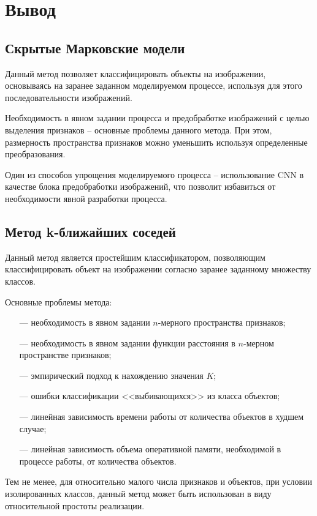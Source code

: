 \section*{Вывод}

\subsection*{Скрытые Марковские модели}

Данный метод позволяет классифицировать объекты на изображении, основываясь на заранее заданном моделируемом процессе, используя для этого последовательности изображений. 

Необходимость в явном задании процесса и предобработке изображений с целью выделения признаков -- основные проблемы данного метода. При этом, размерность пространства признаков можно уменьшить используя определенные преобразования.

Один из способов упрощения моделируемого процесса -- использование CNN в качестве блока предобработки изображений, что позволит избавиться от необходимости явной разработки процесса.

\subsection*{Метод k-ближайших соседей}

Данный метод является простейшим классификатором, позволяющим классифицировать объект на изображении согласно заранее заданному множеству классов.

Основные проблемы метода:
\begin{itemize}
    \item[---] необходимость в явном задании $n$-мерного пространства признаков;
    \item[---] необходимость в явном задании функции расстояния в $n$-мерном пространстве признаков;
    \item[---] эмпирический подход к нахождению значения $K$;
    \item[---] ошибки классификации <<выбивающихся>> из класса объектов;
    \item[---] линейная зависимость времени работы от количества объектов в худшем случае;
    \item[---] линейная зависимость объема оперативной памяти, необходимой в процессе работы, от количества объектов.
\end{itemize}

Тем не менее, для относительно малого числа признаков и объектов, при условии изолированных классов, данный метод может быть использован в виду относительной простоты реализации.

